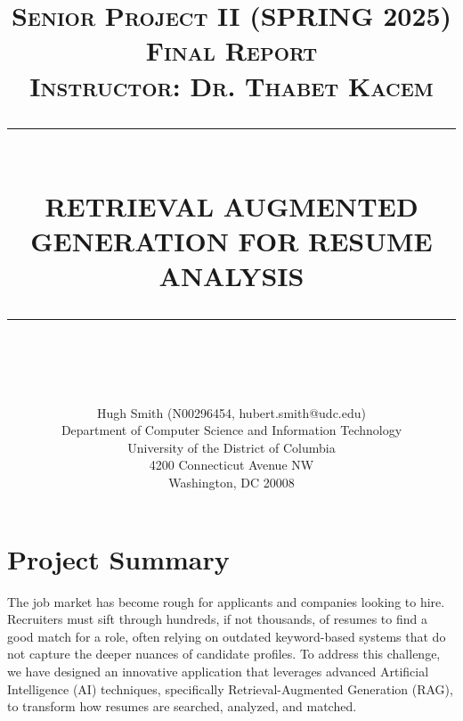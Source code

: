 \documentclass[12pt]{report}
\newcommand{\HRule}[1]{\rule{\linewidth}{#1}}
\begin{document}
\title{ \normalsize \textsc{Senior Project II (SPRING 2025)\\Final Report\\Instructor: Dr. Thabet Kacem}\\
		\HRule{0.5pt} \\
		\LARGE \textbf{\uppercase{Retrieval Augmented Generation for Resume Analysis}}
		\HRule{2pt} \\ [0.5cm]
		\normalsize \vspace*{5\baselineskip}}
		
\date{}

\author{Hugh Smith (N00296454, hubert.smith@udc.edu)\\
		Department of Computer Science and Information Technology\\
		University of the District of Columbia\\
		4200 Connecticut Avenue NW\\
		Washington, DC 20008}
\maketitle

\tableofcontents

\thispagestyle{empty} %

\newpage

\sectionfont{\scshape}


\section{Project Summary}

The job market has become rough for applicants and companies looking to hire. Recruiters must sift through hundreds, if not thousands, of resumes to find a good match for a role, often relying on outdated keyword-based systems that do not capture the deeper nuances of candidate profiles. To address this challenge, we have designed an innovative application that leverages advanced Artificial Intelligence (AI) techniques, specifically Retrieval-Augmented Generation (RAG), to transform how resumes are searched, analyzed, and matched.
\end{document}
